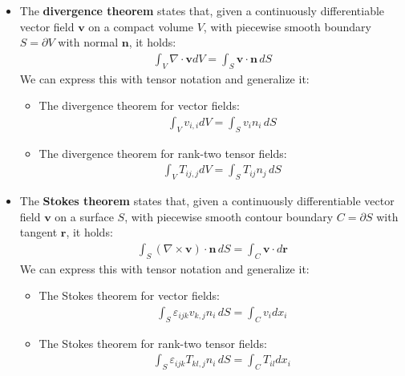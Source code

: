 \documentclass{digitaldynamics}
\def\vect#1{\bm{#1}}
\begin{document}
\begin{itemize}
 
\item The \textbf{divergence theorem} states that, given a continuously differentiable vector field 
$\vect{v}$ on a compact volume $V$, with piecewise smooth boundary 
$S = \partial V$ with normal $\vect{n}$, it holds:
\begin{align}
 \int_V \nabla \cdot \vect{v} dV = \int_{S} \vect{v} \cdot \vect{n} \, dS
\end{align}
We can express this with tensor notation and generalize it:
\begin{itemize}

	\item The divergence theorem for vector fields:
	\begin{align}
		\int_V v_{i,i} dV = \int_{S} v_i n_i \, dS
	 \end{align}
	
	\item The divergence theorem for rank-two tensor fields:
	\begin{align}
		\int_V T_{ij,j} dV = \int_{S} T_{ij} n_j \, dS
	 \end{align}
	
\end{itemize}


\item The \textbf{Stokes theorem} states that, given a continuously differentiable vector field $\vect{v}$ on a surface $S$, with piecewise smooth contour boundary $C = \partial S$ with tangent $\vect{r}$, it holds:
\begin{align}
 \int_S (\nabla \times \vect{v}) \cdot \vect{n} \, dS = \int_{C} \vect{v} \cdot d\vect{r}
\end{align}
We can express this with tensor notation and generalize it:
\begin{itemize}

	\item The Stokes theorem for vector fields:
	\begin{align}
		\int_S \varepsilon_{ijk} v_{k,j} n_i \, dS = \int_{C} v_i dx_i
	 \end{align}
	
	\item The Stokes theorem for rank-two tensor fields:
	\begin{align}
		\int_S \varepsilon_{ijk} T_{kl,j} n_i \, dS = \int_{C} T_{il} dx_i
	 \end{align}
	
\end{itemize}

\end{itemize}
\end{document}
